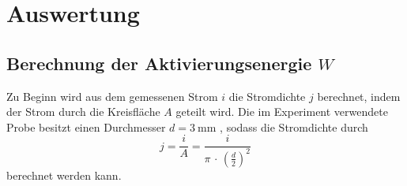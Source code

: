 \section{Auswertung}
\label{sec:Auswertung}
\subsection{Berechnung der Aktivierungsenergie $W$}
Zu Beginn wird aus dem gemessenen Strom $i$ die Stromdichte $j$ berechnet,
indem der Strom durch die
Kreisfläche $A$ geteilt wird. Die im Experiment verwendete Probe besitzt einen
Durchmesser $d =\SI{3}{\milli\meter}$ \cite{V48}, sodass die Stromdichte
durch
\begin{equation}
  j = \frac{i}{A} = \frac{i}{\pi \, \cdot \, \left( \frac{d}{2}\right)^2}
\end{equation}
berechnet werden kann.

